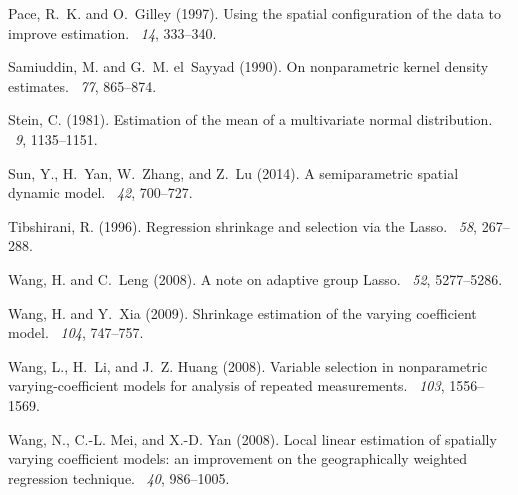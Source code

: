 \documentclass[authoryear,review, 12pt]{elsarticle}
\begin{document}
\begin{thebibliography}{}
Pace, R.~K. and O.~Gilley (1997).
\newblock Using the spatial configuration of the data to improve estimation.
~{\em 14},
  333--340.

Samiuddin, M. and G.~M. el~Sayyad (1990).
\newblock On nonparametric kernel density estimates.
~{\em 77}, 865--874.

Stein, C. (1981).
\newblock Estimation of the mean of a multivariate normal distribution.
~{\em 9}, 1135--1151.

Sun, Y., H.~Yan, W.~Zhang, and Z.~Lu (2014).
\newblock A semiparametric spatial dynamic model.
~{\em 42}, 700--727.

Tibshirani, R. (1996).
\newblock Regression shrinkage and selection via the {L}asso.
~{\em 58},
  267--288.

Wang, H. and C.~Leng (2008).
\newblock A note on adaptive group {L}asso.
~{\em 52},
  5277--5286.

Wang, H. and Y.~Xia (2009).
\newblock Shrinkage estimation of the varying coefficient model.
~{\em 104},
  747--757.

Wang, L., H.~Li, and J.~Z. Huang (2008).
\newblock Variable selection in nonparametric varying-coefficient models for
  analysis of repeated measurements.
~{\em 103},
  1556--1569.

Wang, N., C.-L. Mei, and X.-D. Yan (2008).
\newblock Local linear estimation of spatially varying coefficient models: an
  improvement on the geographically weighted regression technique.
~{\em 40}, 986--1005.


\end{thebibliography}
\end{document}
